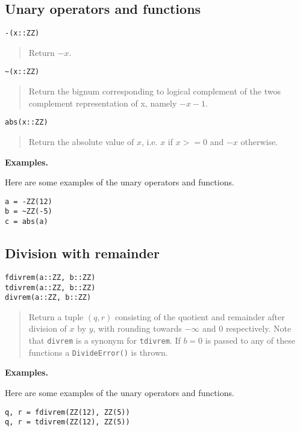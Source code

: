 \documentclass[a4paper,10pt]{article}
\newcommand{\code}{\lstinline}
\newcommand{\desc}[1]{\vspace{-3mm}\begin{quote}#1\end{quote}}
\begin{document}
{{{\subsection{Unary operators and functions}

\begin{lstlisting}
-(x::ZZ)
\end{lstlisting}

\desc{Return $-x$.}

\begin{lstlisting}
~(x::ZZ)
\end{lstlisting}

\desc{Return the bignum corresponding to logical complement of the twos 
complement representation of x, namely $-x - 1$.}

\begin{lstlisting}
abs(x::ZZ)
\end{lstlisting}

\desc{Return the absolute value of $x$, i.e. $x$ if $x >= 0$ and $-x$ otherwise.}

\textbf{Examples.}

Here are some examples of the unary operators and functions.

\begin{lstlisting}
a = -ZZ(12)
b = ~ZZ(-5)
c = abs(a)
\end{lstlisting}

\subsection{Division with remainder}

\begin{lstlisting}
fdivrem(a::ZZ, b::ZZ)
tdivrem(a::ZZ, b::ZZ)
divrem(a::ZZ, b::ZZ)
\end{lstlisting}

\desc{Return a tuple $(q, r)$ consisting of the quotient and remainder after 
division of $x$ by $y$, with rounding towards $-\infty$ and $0$ respectively. Note 
that \code{divrem} is a synonym for \code{tdivrem}. If $b = 0$ is passed to any
of these functions a \code{DivideError()} is thrown.}

\textbf{Examples.}

Here are some examples of the unary operators and functions.

\begin{lstlisting}
q, r = fdivrem(ZZ(12), ZZ(5))
q, r = tdivrem(ZZ(12), ZZ(5))
\end{lstlisting}

}}}
\end{document}
